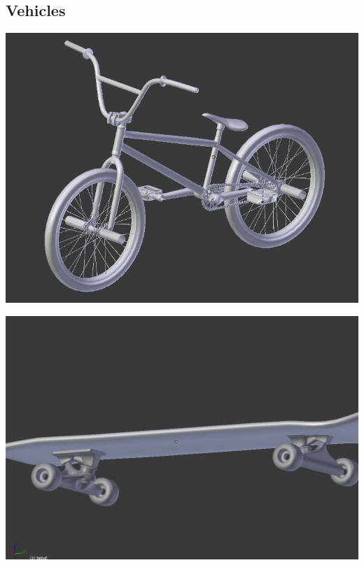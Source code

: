 \documentclass{article}
\begin{document}
  \subsection{Vehicles}

  \includegraphics[width=\textwidth]{12.png}

  \includegraphics[width=\textwidth]{13.png}
  
\end{document}
